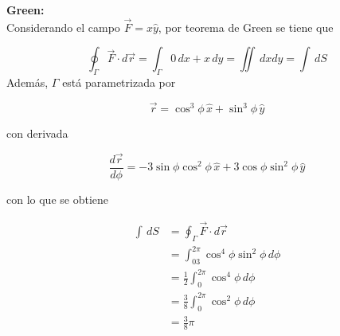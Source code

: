 \bigbreak

\textbf{Green:}\\

Considerando el campo $\Vec{F}=x\hat{y}$, por teorema de Green se tiene que

\[\oint_\Gamma \Vec{F}\cdot d\Vec{r}=\int_\Gamma 0\,dx+x\,dy=\iint\,dxdy=\int\,dS\]
\bigbreak
Además, $\Gamma$ está parametrizada por

\[\Vec{r}=\cos^3\phi\,\hat{x}+\sin^3\phi\,\hat{y}\]

con derivada

\[\frac{d\Vec{r}}{d\phi}=-3\sin\phi\cos^2\phi\,\hat{x}+3\cos\phi\sin^2\phi\,\hat{y}\]

con lo que se obtiene

\begin{equation}
\begin{split}
    \int\,dS&=\oint_\Gamma \Vec{F}\cdot d\Vec{r}\\
    &=\int^{2\pi}_03\cos^4\phi\sin^2\phi\,d\phi\\
    &=\frac{1}{2}\int^{2\pi}_0\cos^4\phi\,d\phi\\
    &=\frac{3}{8}\int^{2\pi}_0\cos^2\phi\,d\phi\\
    &=\frac{3}{8}\pi\\
\end{split}
\nonumber
\end{equation}

\newpage